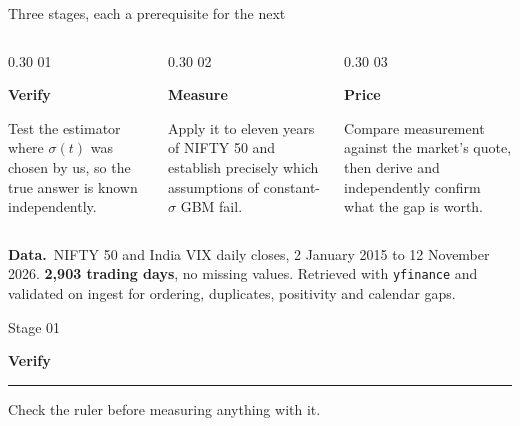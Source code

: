\documentclass[aspectratio=169,11pt]{beamer}
\newcommand{\lead}[1]{{\sffamily\bfseries\color{accent}#1}}
\newcommand{\divider}[3]{%
{\setbeamertemplate{footline}{}
\begin{frame}
\vfill
{\sffamily\scriptsize\color{accent}Stage #1}\par\vspace{0.3em}
{\sffamily\bfseries\Huge\color{ink}#2}\par\vspace{0.6em}
{\color{rule}\rule{0.42\textwidth}{0.6pt}}\par\vspace{0.5em}
{\color{muted}#3}
\vfill
\end{frame}}}
\begin{document}
\begin{frame}{Three stages, each a prerequisite for the next}
\begin{columns}[T]
\begin{column}{0.30\textwidth}
{\sffamily\scriptsize\color{accent}01}\par
{\sffamily\bfseries\color{ink}Verify}\par\vspace{0.3em}
\small Test the estimator where $\sigma(t)$ was chosen by us, so the true answer is known
independently.
\end{column}
\begin{column}{0.30\textwidth}
{\sffamily\scriptsize\color{accent}02}\par
{\sffamily\bfseries\color{ink}Measure}\par\vspace{0.3em}
\small Apply it to eleven years of NIFTY 50 and establish precisely which assumptions of
constant-$\sigma$ GBM fail.
\end{column}
\begin{column}{0.30\textwidth}
{\sffamily\scriptsize\color{accent}03}\par
{\sffamily\bfseries\color{ink}Price}\par\vspace{0.3em}
\small Compare measurement against the market's quote, then derive and independently confirm
what the gap is worth.
\end{column}
\end{columns}
\vspace{1.1em}
\begin{inknote}
\small\lead{Data.}\ NIFTY 50 and India VIX daily closes, 2 January 2015 to 12 November 2026.
\textbf{2,903 trading days}, no missing values. Retrieved with \texttt{yfinance} and validated
on ingest for ordering, duplicates, positivity and calendar gaps.
\end{inknote}
\end{frame}

\divider{01}{Verify}{Check the ruler before measuring anything with it.}
\end{document}
